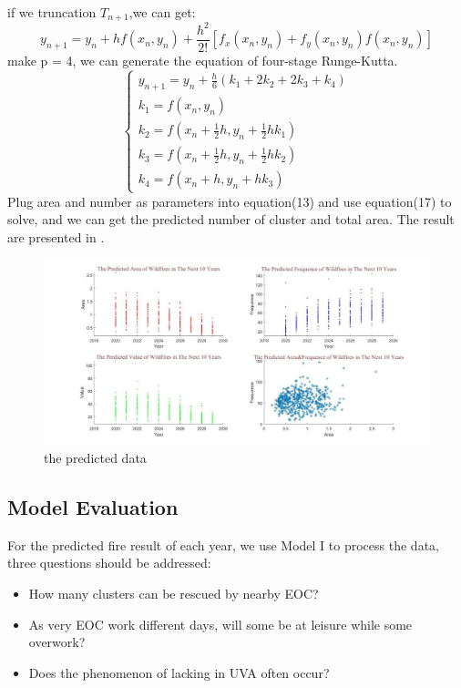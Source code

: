 \documentclass{mcmthesis}
\begin{document}
if we truncation $T_{n+1}$,we can get:
\begin{equation}
	y_{n+1}=y_n+hf(x_n,y_n)+\frac{h^2}{2!}[f_x(x_n,y_n)+f_y(x_n,y_n)f(x_n,y_n)]
\end{equation}
make p = 4, we can generate the equation of four-stage Runge-Kutta.
\begin{equation}
\begin{cases}
	y_{n+1} = y_n+\frac{h}{6}(k_1+2k_2+2k_3+k_4) \\
	k_1 = f(x_n,y_n)\\
	k_2 = f(x_n+\frac{1}{2}h,y_n+\frac{1}{2}hk_1)\\
	k_3 = f(x_n+\frac{1}{2}h,y_n+\frac{1}{2}hk_2)\\
	k_4 = f(x_n+h,y_n+hk_3)
\end{cases}
\end{equation}
Plug area and number as parameters into equation(13) and use equation(17) to solve, and we can get the predicted number of cluster and total area. The result are presented in .
\begin{figure}[h]
	\small
	\centering
	\includegraphics[width=0.8\linewidth]{Figure/Predicted.png}
	\caption{the predicted data} \label{fig:Pre}
\end{figure}

\subsection{Model Evaluation}
For the predicted ﬁre result of each year, we use Model I to process the data, three questions should be addressed:
\begin{itemize}
	\item How many clusters can be rescued by nearby EOC?
	\item As very EOC work different days, will some be at leisure while some overwork?
	\item Does the phenomenon of lacking in UVA often occur?
\end{itemize}
\end{document}

